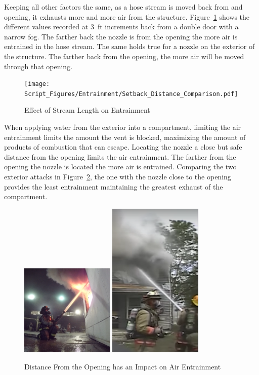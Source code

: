\documentclass[12pt,oneside]{book}
\begin{document}
Keeping all other factors the same, as a hose stream is moved back from and opening, it exhausts more and more air from the structure. Figure~\ref{fig:Setback} shows the different values recorded at 3~ft increments back from a double door with a narrow fog. The farther back the nozzle is from the opening the more air is entrained in the hose stream. The same holds true for a nozzle on the exterior of the structure. The farther back from the opening, the more air will be moved through that opening. 

\begin{figure}[H]
\centering
\texttt{[image: Script\_Figures/Entrainment/Setback\_Distance\_Comparison.pdf]}
\caption{Effect of Stream Length on Entrainment}
\label{fig:Setback}
\end{figure}

When applying water from the exterior into a compartment, limiting the air entrainment limits the amount the vent is blocked, maximizing the amount of products of combustion that can escape. Locating the nozzle a close but safe distance from the opening limits the air entrainment. The farther from the opening the nozzle is located the more air is entrained. Comparing the two exterior attacks in Figure~\ref{fig:ExteriorDist}, the one with the nozzle close to the opening provides the least entrainment maintaining the greatest exhaust of the compartment.

\begin{figure}[H]
\centering
\includegraphics[width=0.4\textwidth]{Figures/Air_Entrainment/Exterior_Attack.png}
\includegraphics[width=0.4\textwidth]{Figures/Air_Entrainment/Exterior_Attack_Far.png}
\caption{Distance From the Opening has an Impact on Air Entrainment}
\label{fig:ExteriorDist}
\end{figure}
\end{document}
